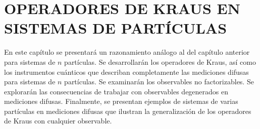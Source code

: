 

\section{OPERADORES DE KRAUS EN SISTEMAS DE \texorpdfstring{}{n} PARTÍCULAS}


 En este capítulo se presentará un razonamiento análogo al del capítulo anterior para sistemas de $n$ partículas. Se  desarrollarán los operadores de Kraus, así como los instrumentos cuánticos que describan completamente las mediciones difusas para sistemas de $n$ partículas. Se examinarán los observables no factorizables. Se explorarán las consecuencias de trabajar con observables degenerados en mediciones difusas.  Finalmente, se presentan ejemplos de sistemas de varias partículas en mediciones difusas que ilustran la generalización de los operadores de Kraus con cualquier observable.  